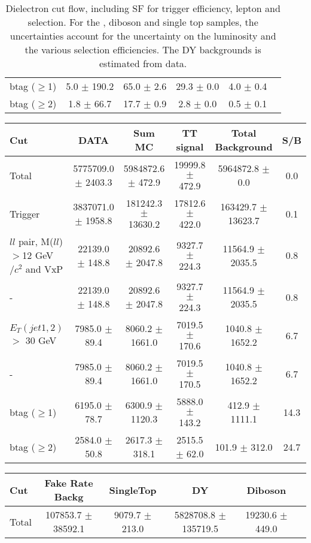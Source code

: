 \documentclass[amsmath,amssymb]{revtex4}
\begin{document}
\begin{landscape}
\begin{table}[p]
\begin{tabular}{|l|c|c|c|c|c|}
btag ($\ge$1) & 5.0 $\pm$ 190.2 & 65.0 $\pm$ 2.6 & 29.3 $\pm$ 0.0 & 4.0 $\pm$ 0.4 \\
btag ($\ge$2) & 1.8 $\pm$ 66.7 & 17.7 $\pm$ 0.9 & 2.8 $\pm$ 0.0 & 0.5 $\pm$ 0.1 \\
\hline 
\hline
\end{tabular}
\caption{ Dielectron cut flow, including SF for trigger efficiency, lepton and \met selection. For the \ttbar, diboson and single top samples, the uncertainties account for the uncertainty on the luminosity and the various selection efficiencies. The DY backgrounds is estimated from data.}
\label{Table:CutFlow_ee}
\end{table}
\end{landscape}
\clearpage
\begin{landscape}
\begin{table}[p]
\begin{tabular}{|l|c|c|c|c|c|}
\hline
\hline
Cut & DATA & Sum MC & TT signal  & Total Background & S/B \\
\hline
Total & 5775709.0 $\pm$ 2403.3 & 5984872.6 $\pm$ 472.9 & 19999.8 $\pm$ 472.9 & 5964872.8 $\pm$ 0.0 & 0.0 \\
Trigger & 3837071.0 $\pm$ 1958.8 & 181242.3 $\pm$ 13630.2 & 17812.6 $\pm$ 422.0 & 163429.7 $\pm$ 13623.7 & 0.1 \\
$ll$ pair, M($ll$)$>$12 GeV$/c^2$ and VxP & 22139.0 $\pm$ 148.8 & 20892.6 $\pm$ 2047.8 & 9327.7 $\pm$ 224.3 & 11564.9 $\pm$ 2035.5 & 0.8 \\
 -  & 22139.0 $\pm$ 148.8 & 20892.6 $\pm$ 2047.8 & 9327.7 $\pm$ 224.3 & 11564.9 $\pm$ 2035.5 & 0.8 \\
$E_T(jet1,2)$ $>$ 30 GeV & 7985.0 $\pm$ 89.4 & 8060.2 $\pm$ 1661.0 & 7019.5 $\pm$ 170.6 & 1040.8 $\pm$ 1652.2 & 6.7 \\
 -  & 7985.0 $\pm$ 89.4 & 8060.2 $\pm$ 1661.0 & 7019.5 $\pm$ 170.5 & 1040.8 $\pm$ 1652.2 & 6.7 \\
btag ($\ge$1) & 6195.0 $\pm$ 78.7 & 6300.9 $\pm$ 1120.3 & 5888.0 $\pm$ 143.2 & 412.9 $\pm$ 1111.1 & 14.3 \\
btag ($\ge$2) & 2584.0 $\pm$ 50.8 & 2617.3 $\pm$ 318.1 & 2515.5 $\pm$ 62.0 & 101.9 $\pm$ 312.0 & 24.7 \\
\hline
\hline
\end{tabular}
\begin{tabular}{|l|c|c|c|c|c|}
\hline
\hline
Cut & Fake Rate Backg & SingleTop & DY & Diboson  \\
\hline
Total & 107853.7 $\pm$ 38592.1 & 9079.7 $\pm$ 213.0 & 5828708.8 $\pm$ 135719.5 & 19230.6 $\pm$ 449.0 \\

\end{tabular}
\end{table}
\end{landscape}
\end{document}

